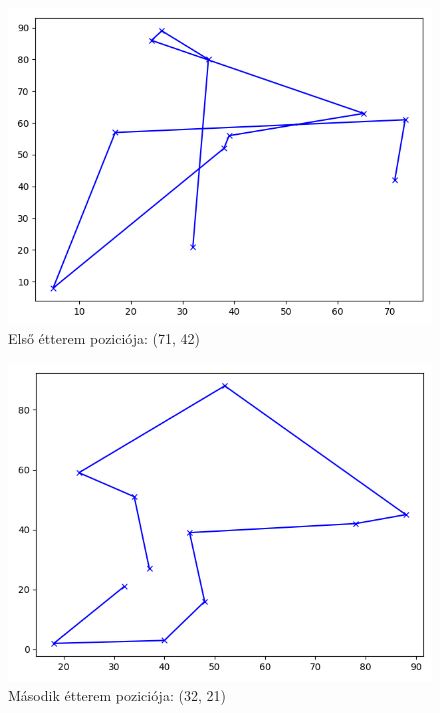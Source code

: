 \begin{figure}[h!]
\centering
\includegraphics[scale=0.8]{images/tsp1MR.png}
\caption{Első étterem poziciója: (71, 42)}
\label{fig:tspMR1}
\end{figure}

\begin{figure}[h!]
\centering
\includegraphics[scale=0.8]{images/tsp2MR.png}
\caption{Második étterem poziciója: (32, 21)}
\label{fig:tspMR2}
\end{figure}

